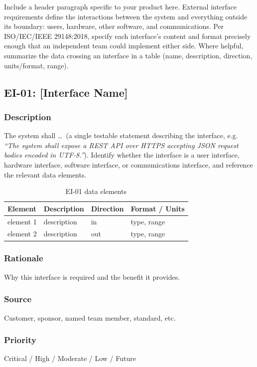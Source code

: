 Include a header paragraph specific to your product here. External interface requirements define the interactions between the system and everything outside its boundary: users, hardware, other software, and communications. Per ISO/IEC/IEEE 29148:2018, specify each interface's content and format precisely enough that an independent team could implement either side. Where helpful, summarize the data crossing an interface in a table (name, description, direction, units/format, range).

\subsection{EI-01: [Interface Name]}
\subsubsection{Description}
The system shall \ldots\ (a single testable statement describing the interface, e.g. \textit{``The system shall expose a REST API over HTTPS accepting JSON request bodies encoded in UTF-8.''}). Identify whether the interface is a user interface, hardware interface, software interface, or communications interface, and reference the relevant data elements.

\begin{table}[H]
\caption{EI-01 data elements}
\begin{center}
    \begin{tabular}{ | p{2.5cm} | p{5cm} | p{2cm} | p{3cm} |}
    \hline
    \textbf{Element} & \textbf{Description} & \textbf{Direction} & \textbf{Format / Units} \\ \hline
    element 1 & description & in & type, range \\ \hline
    element 2 & description & out & type, range \\ \hline
    \end{tabular}
\end{center}
\end{table}
\subsubsection{Rationale}
Why this interface is required and the benefit it provides.
\subsubsection{Source}
Customer, sponsor, named team member, standard, etc.
\subsubsection{Priority}
Critical / High / Moderate / Low / Future
